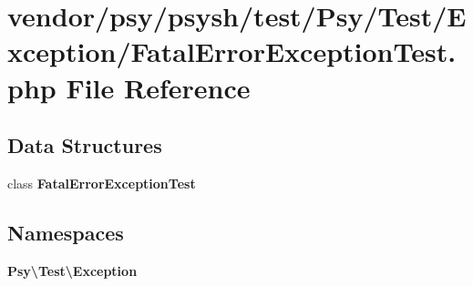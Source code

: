 \section{vendor/psy/psysh/test/\+Psy/\+Test/\+Exception/\+Fatal\+Error\+Exception\+Test.php File Reference}
\label{_fatal_error_exception_test_8php}
\subsection*{Data Structures}
\begin{DoxyCompactItemize}
\item 
class {\bf Fatal\+Error\+Exception\+Test}
\end{DoxyCompactItemize}
\subsection*{Namespaces}
\begin{DoxyCompactItemize}
\item 
 {\bf Psy\textbackslash{}\+Test\textbackslash{}\+Exception}
\end{DoxyCompactItemize}
